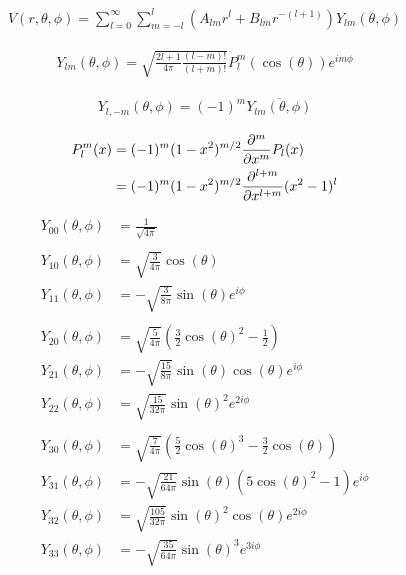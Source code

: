 \begin{align*}
	V(r,\theta,\phi) = \sum_{l=0}^{\infty} \sum_{m=-l}^l%
		(A_{lm} r^l + B_{lm} r^{-(l+1)})Y_{lm}(\theta,\phi)
\end{align*}

\begin{align*}
	Y_{lm}(\theta, \phi) = \sqrt{\frac{2l+1}{4\pi} \frac{(l-m)!}{(l+m)!}} P_l^m(\cos(\theta)) e^{im\phi}
\end{align*}

\begin{align*}
	Y_{l,-m}(\theta, \phi) = (-1)^m \overline{Y_{lm}(\theta, \phi)}
\end{align*}

\begin{align*}
	P_l^m(x) &= (-1)^m (1-x^2)^{m/2} \frac{\partial^m}{\partial x^m} P_l(x) \\
			 &= (-1)^m (1-x^2)^{m/2} \frac{\partial^{l+m}}{\partial x^{l+m}} (x^2-1)^l
\end{align*}

\begin{align*}
	Y_{00}(\theta, \phi) &=%
		\frac{1}{\sqrt{4\pi}} \\
	\\
	Y_{10}(\theta, \phi) &=%
		\sqrt{\frac{3}{4\pi}} \cos(\theta) \\
	Y_{11}(\theta, \phi) &=%
		-\sqrt{\frac{3}{8\pi}} \sin(\theta) e^{i\phi} \\
	\\
	Y_{20}(\theta, \phi) &=%
		\sqrt{\frac{5}{4\pi}} (\tfrac{3}{2}\cos(\theta)^2-\tfrac{1}{2}) \\
	Y_{21}(\theta, \phi) &=%
		-\sqrt{\frac{15}{8\pi}} \sin(\theta) \cos(\theta) e^{i\phi} \\
	Y_{22}(\theta, \phi) &=%
		\sqrt{\frac{15}{32\pi}} \sin(\theta)^2 e^{2i\phi} \\
	\\
	Y_{30}(\theta, \phi) &=%
		\sqrt{\frac{7}{4\pi}} (\tfrac{5}{2}\cos(\theta)^3-\tfrac{3}{2}\cos(\theta)) \\
	Y_{31}(\theta, \phi) &=%
		-\sqrt{\frac{21}{64\pi}} \sin(\theta) (5\cos(\theta)^2-1) e^{i\phi} \\
	Y_{32}(\theta, \phi) &=%
		\sqrt{\frac{105}{32\pi}} \sin(\theta)^2 \cos(\theta) e^{2i\phi} \\
	Y_{33}(\theta, \phi) &=%
		-\sqrt{\frac{35}{64\pi}} \sin(\theta)^3 e^{3i\phi} \\
\end{align*}
